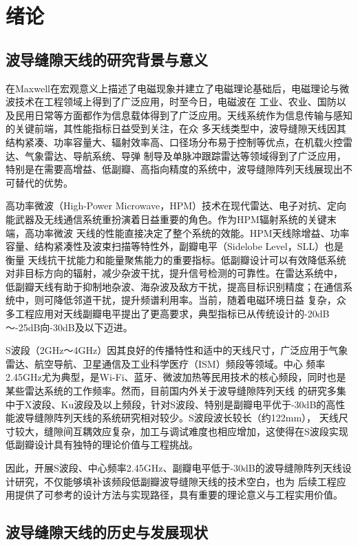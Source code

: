\section{绪论}\label{sec:introduction}

\subsection{波导缝隙天线的研究背景与意义}
    在Maxwell在宏观意义上描述了电磁现象并建立了电磁理论基础后，电磁理论与微波技术在工程领域上得到了广泛应用，时至今日，电磁波在
工业、农业、国防以及民用日常等方面都作为信息载体得到了广泛应用。天线系统作为信息传输与感知的关键前端，其性能指标日益受到关注，在众
多天线类型中，波导缝隙天线因其结构紧凑、功率容量大、辐射效率高、口径场分布易于控制等优点，在机载火控雷达、气象雷达、导航系统、导弹
制导及单脉冲跟踪雷达等领域得到了广泛应用，特别是在需要高增益、低副瓣、高指向精度的系统中，波导缝隙阵列天线展现出不可替代的优势。

    高功率微波（High-Power Microwave，HPM）技术在现代雷达、电子对抗、定向能武器及无线通信系统重扮演着日益重要的角色。作为HPM辐射系统的关键末端，高功率微波
天线的性能直接决定了整个系统的效能。HPM天线除增益、功率容量、结构紧凑性及波束扫描等特性外，副瓣电平（Sidelobe Level，SLL）也是衡量
天线抗干扰能力和能量聚焦能力的重要指标。低副瓣设计可以有效降低系统对非目标方向的辐射，减少杂波干扰，提升信号检测的可靠性。在雷达系统中，
低副瓣天线有助于抑制地杂波、海杂波及敌方干扰，提高目标识别精度；在通信系统中，则可降低邻道干扰，提升频谱利用率。当前，随着电磁环境日益
复杂，众多工程应用对天线副瓣电平提出了更高要求，典型指标已从传统设计的-20dB～-25dB向-30dB及以下迈进。

    S波段（2GHz～4GHz）因其良好的传播特性和适中的天线尺寸，广泛应用于气象雷达、航空导航、卫星通信及工业科学医疗（ISM）频段等领域。中心
频率2.45GHz尤为典型，是Wi-Fi、蓝牙、微波加热等民用技术的核心频段，同时也是某些雷达系统的工作频率。然而，目前国内外关于波导缝隙阵列天线
的研究多集中于X波段、Ku波段及以上频段，针对S波段、特别是副瓣电平优于-30dB的高性能波导缝隙阵列天线的系统研究相对较少。S波段波长较长（约122mm），
天线尺寸较大，缝隙间互耦效应复杂，加工与调试难度也相应增加，这使得在S波段实现低副瓣设计具有独特的理论价值与工程挑战。

    因此，开展S波段、中心频率2.45GHz、副瓣电平低于-30dB的波导缝隙阵列天线设计研究，不仅能够填补该频段低副瓣波导缝隙天线的技术空白，也为
后续工程应用提供了可参考的设计方法与实现路径，具有重要的理论意义与工程实用价值。

\subsection{波导缝隙天线的历史与发展现状}

